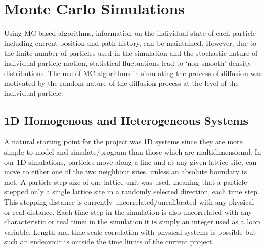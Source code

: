 
\section{Monte Carlo Simulations}
\label{section:mc-sims}

	Using MC-based algorithms, information on the individual state of each particle including current position and path history, can be maintained. However, due to the finite number of particles used in the simulation and the stochastic nature of individual particle motion, statistical fluctuations lead to `non-smooth' density distributions. The use of MC algorithms in simulating the process of diffusion was motivated by the random nature of the diffusion process at the level of the individual particle.

\subsection{1D Homogenous and Heterogeneous Systems}
\label{section:mc-sims-1D}
	A natural starting point for the project was 1D systems since they are more simple to model and simulate/program than those which are multidimensional. In our 1D simulations, particles move along a line and at any given lattice site, can move to either one of the two neighbour sites, unless an absolute boundary is met. A particle step-size of one lattice unit was used, meaning that a particle stepped only a single lattice site in a randomly selected direction, each time step. This stepping distance is currently uncorrelated/uncalibrated with any physical or real distance. Each time step in the simulation is also uncorrelated with any characteristic or real time; in the simulation it is simply an integer used as a loop variable. Length and time-scale correlation with physical systems is possible but such an endeavour is outside the time limits of the current project.
	
